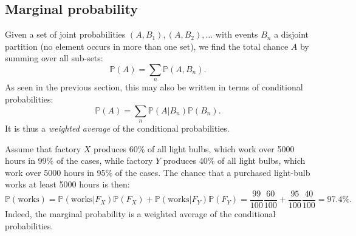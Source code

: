 \documentclass{article}
\begin{document}
\subsection{Marginal probability}
Given a set of joint probabilities $(A,B_1),(A,B_2),\dots$ with events $B_n$ a disjoint partition (no element occurs in more than one set), we find the total chance $A$ by summing over all sub-sets:
\begin{equation}
    \mathbb{P}(A) = \sum_n \mathbb{P}(A,B_n).
\end{equation}
As seen in the previous section, this may also be written in terms of conditional probabilities:
\begin{equation}
    \mathbb{P}(A) = \sum_n \mathbb{P}(A|B_n)\mathbb{P}(B_n).
\end{equation}
It is thus a \textit{weighted average} of the conditional probabilities.
\begin{testexample}
    Assume that factory $X$ produces 60\% of all light bulbs, which work over 5000 hours in 99\% of the cases, while factory $Y$ produces 40\% of all light bulbs, which work over 5000 hours in 95\% of the cases. The chance that a purchased light-bulb works at least 5000 hours is then:
    \begin{equation}
        \mathbb{P}(\text{works}) = \mathbb{P}(\text{works}|F_X)\mathbb{P}(F_X) + \mathbb{P}(\text{works}|F_Y)\mathbb{P}(F_Y) = \frac{99}{100}\frac{60}{100} + \frac{95}{100}\frac{40}{100} = 97.4\%.
    \end{equation}
    Indeed, the marginal probability is a weighted average of the conditional probabilities.
\end{testexample}
\end{document}
